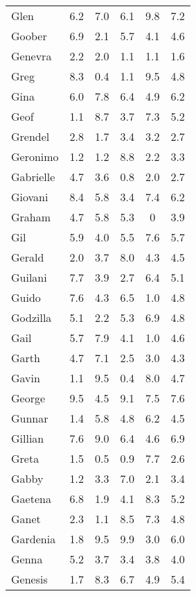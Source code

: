 \begin{center}
\begin{longtable}{lccccc}
\endfoot %
  \bottomrule
\endlastfoot %
    Glen & 6.2 & 7.0 & 6.1 & 9.8 & 7.2 \\
    Goober & 6.9 & 2.1 & 5.7 & 4.1 & 4.6 \\
    Genevra & 2.2 & 2.0 & 1.1 & 1.1 & 1.6 \\
    Greg & 8.3 & 0.4 & 1.1 & 9.5 & 4.8 \\
    Gina & 6.0 & 7.8 & 6.4 & 4.9 & 6.2 \\
    Geof & 1.1 & 8.7 & 3.7 & 7.3 & 5.2 \\
    Grendel & 2.8 & 1.7 & 3.4 & 3.2 & 2.7 \\
    Geronimo & 1.2 & 1.2 & 8.8 & 2.2 & 3.3 \\
    Gabrielle & 4.7 & 3.6 & 0.8 & 2.0 & 2.7 \\
    Giovani & 8.4 & 5.8 & 3.4 & 7.4 & 6.2 \\
    Graham & 4.7 & 5.8 & 5.3 & 0 & 3.9 \\
    Gil & 5.9 & 4.0 & 5.5 & 7.6 & 5.7 \\
    Gerald & 2.0 & 3.7 & 8.0 & 4.3 & 4.5 \\
    Guilani & 7.7 & 3.9 & 2.7 & 6.4 & 5.1 \\
    Guido & 7.6 & 4.3 & 6.5 & 1.0 & 4.8 \\
    Godzilla & 5.1 & 2.2 & 5.3 & 6.9 & 4.8 \\
    Gail & 5.7 & 7.9 & 4.1 & 1.0 & 4.6 \\
    Garth & 4.7 & 7.1 & 2.5 & 3.0 & 4.3 \\
    Gavin & 1.1 & 9.5 & 0.4 & 8.0 & 4.7 \\
    George & 9.5 & 4.5 & 9.1 & 7.5 & 7.6 \\
    Gunnar & 1.4 & 5.8 & 4.8 & 6.2 & 4.5 \\
    Gillian & 7.6 & 9.0 & 6.4 & 4.6 & 6.9 \\
    Greta & 1.5 & 0.5 & 0.9 & 7.7 & 2.6 \\
    Gabby & 1.2 & 3.3 & 7.0 & 2.1 & 3.4 \\
    Gaetena & 6.8 & 1.9 & 4.1 & 8.3 & 5.2 \\
    Ganet & 2.3 & 1.1 & 8.5 & 7.3 & 4.8 \\
    Gardenia & 1.8 & 9.5 & 9.9 & 3.0 & 6.0 \\
    Genna & 5.2 & 3.7 & 3.4 & 3.8 & 4.0 \\
    Genesis & 1.7 & 8.3 & 6.7 & 4.9 & 5.4 \\

\end{longtable}
\end{center}
